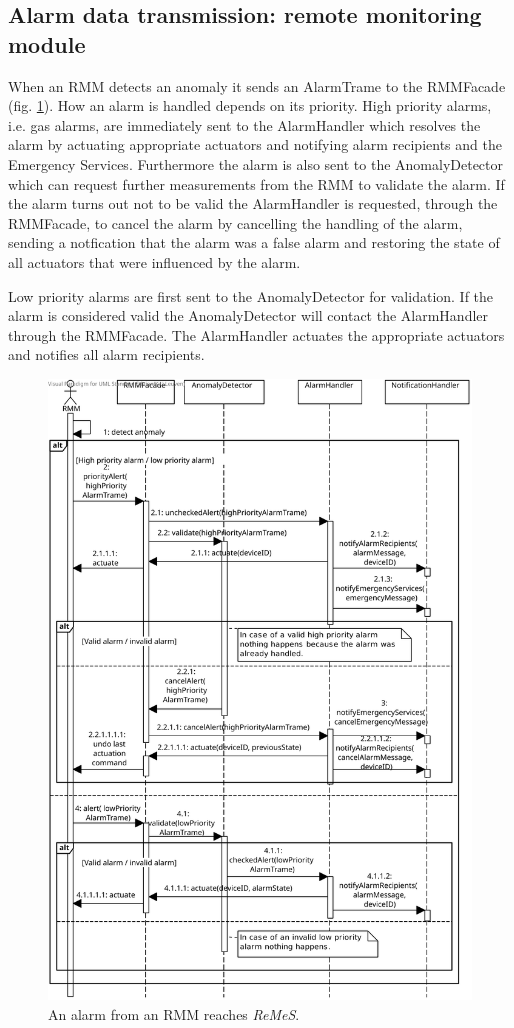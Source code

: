 \documentclass[a4paper,10pt]{article}
\newcommand{\rem}{\emph{ReMeS}\xspace}
\begin{document}
\subsection{Alarm data transmission: remote monitoring module}
When an RMM detects an anomaly it sends an AlarmTrame to the RMMFacade (fig. \ref{fig:seq_alarm}). How an alarm is handled depends on its priority. High priority alarms, i.e. gas alarms, are immediately sent to the AlarmHandler which resolves the alarm by actuating appropriate actuators and notifying alarm recipients and the Emergency Services. Furthermore the alarm is also sent to the AnomalyDetector which can request further measurements from the RMM to validate the alarm. If the alarm turns out not to be valid the AlarmHandler is requested, through the RMMFacade, to cancel the alarm by cancelling the handling of the alarm, sending a notfication that the alarm was a false alarm and restoring the state of all actuators that were influenced by the alarm.

Low priority alarms are first sent to the AnomalyDetector for validation. If the alarm is considered valid the AnomalyDetector will contact the AlarmHandler through the RMMFacade. The AlarmHandler actuates the appropriate actuators and notifies all alarm recipients.

\begin{figure}[!htp]
    \centering
    \includegraphics[width=\textwidth]{RMM Alarm}
    \caption{An alarm from an RMM reaches \rem.}
    \label{fig:seq_alarm}
\end{figure}
\end{document}
